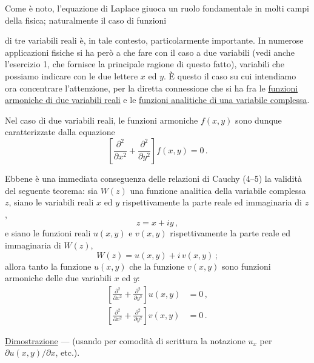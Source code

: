 \documentclass[11pt, a4paper]{book}
\numberwithin{equation}{section}
\begin{document}
Come è noto, l'equazione di Laplace giuoca un ruolo fondamentale in molti campi della fisica; naturalmente il caso di funzioni


di tre variabili reali è, in tale contesto, particolarmente importante. In numerose applicazioni fisiche si ha però a che fare con il caso a due variabili (vedi anche l'esercizio 1, che fornisce la principale ragione di questo fatto), variabili che possiamo indicare con le due lettere $x$ ed $y$. È questo il caso su cui intendiamo ora concentrare l'attenzione, per la diretta connessione che si ha fra le \underline{funzioni armoniche di due variabili reali} e le \underline{funzioni analitiche di una variabile complessa}.

Nel caso di due variabili reali, le funzioni armoniche $f(x,y)$ sono dunque caratterizzate dalla equazione
\begin{equation}
\left[\frac{\partial^2}{\partial x^2} + \frac{\partial^2}{\partial y^2}\right]f(x,y) = 0\,. \tag{3}
\end{equation}

Ebbene è una immediata conseguenza delle relazioni di Cauchy (4--5) la validità del seguente teorema: sia $W(z)$ una funzione analitica della variabile complessa $z$, siano le variabili reali $x$ ed $y$ rispettivamente la parte reale ed immaginaria di $z$,
\begin{equation}
z = x + iy\,, \tag{4}
\end{equation}
e siano le funzioni reali $u(x,y)$ e $v(x,y)$ rispettivamente la parte reale ed immaginaria di $W(z)$,
\begin{equation}
W(z) = u(x,y) + i\,v(x,y)\,; \tag{5}
\end{equation}
allora tanto la funzione $u(x,y)$ che la funzione $v(x,y)$ sono funzioni armoniche delle due variabili $x$ ed $y$:
\begin{align}
\left[\frac{\partial^2}{\partial x^2} + \frac{\partial^2}{\partial y^2}\right]u(x,y) &= 0\,, \tag{6a}\\
\left[\frac{\partial^2}{\partial x^2} + \frac{\partial^2}{\partial y^2}\right]v(x,y) &= 0\,. \tag{6b}
\end{align}

\noindent\underline{Dimostrazione} --- (usando per comodità di scrittura la notazione $u_x$ per $\partial u(x,y)/\partial x$, etc.).

\end{document}
